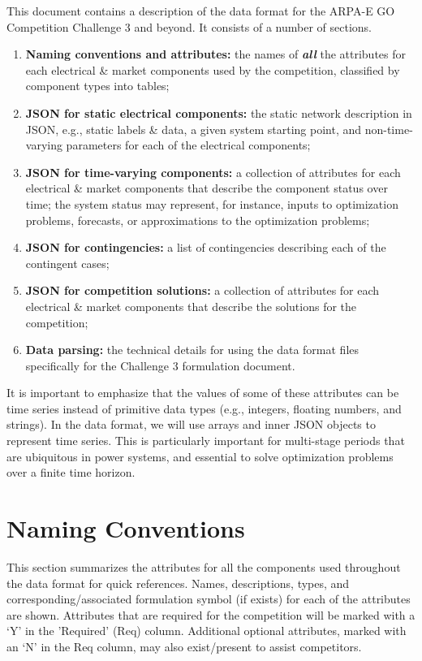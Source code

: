 \documentclass{article}
\begin{document}
This document contains a description of the data format for the ARPA-E GO Competition Challenge 3 and beyond. It consists of a number of sections.
\begin{enumerate}[I]
    \item {\bf Naming conventions and attributes:} the names of \textit{\textbf{all}} the attributes for each electrical \& market components used by the competition, classified by component types into tables;

    \item {\bf JSON for static electrical components:} the static network description in JSON, e.g., static labels \& data, a given system starting point, and non-time-varying parameters for each of the electrical components;

    \item {\bf JSON for time-varying components:} a collection of attributes for each electrical \& market components that describe the component status over time; the system status may represent, for instance, inputs to optimization problems,  forecasts, or approximations to the optimization problems;
    \item {\bf JSON for contingencies:} a list of contingencies describing each of the contingent cases;
    \item {\bf JSON for competition solutions:} a collection of attributes for each electrical \& market components that describe the solutions for the competition;    
     \item {\bf Data parsing:}
     the technical details for using the data format files specifically for the Challenge 3 formulation document.
\end{enumerate}
It is important to emphasize that the values of some of these attributes can be time series instead of primitive data types (e.g., integers, floating numbers, and strings). 
In the data format, we will use arrays and inner JSON objects to represent time series. 
This is particularly important for multi-stage periods that are ubiquitous in power systems, and essential 
to solve optimization problems over a finite time horizon. 


\section{Naming Conventions}
\label{sec:naming}
This section summarizes the attributes for all the components used throughout the data format for quick references. 
Names, descriptions, types, and corresponding/associated formulation symbol (if exists) for each of the attributes are shown.
Attributes that are required for the competition 
will be marked with a `Y' in the 'Required' (Req) column. 
Additional optional attributes, marked with an `N' in the Req column, may also exist/present to assist competitors.
\end{document}

